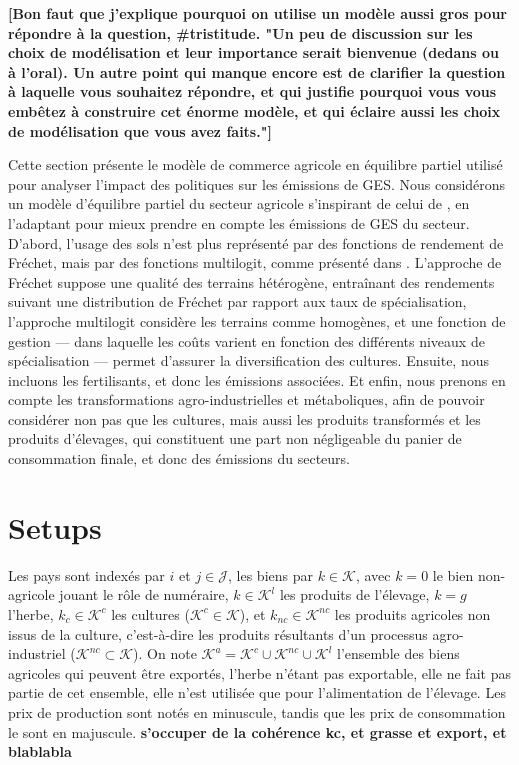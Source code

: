 \textbf{[Bon faut que j'explique pourquoi on utilise un modèle aussi gros pour répondre à la question, \#tristitude. "Un peu de discussion sur les choix de modélisation et leur importance serait bienvenue (dedans ou à l'oral). Un autre point qui manque encore est de clarifier la question à laquelle vous souhaitez répondre, et qui justifie pourquoi vous vous embêtez à construire cet énorme modèle, et qui éclaire aussi les choix de modélisation que vous avez faits."]}

Cette section présente le modèle de commerce agricole en équilibre partiel utilisé pour analyser l’impact des politiques sur les émissions de GES. Nous considérons un modèle d'équilibre partiel du secteur agricole s'inspirant de celui de \cite{Gouel2021}, en l'adaptant pour mieux prendre en compte les émissions de GES du secteur. D'abord, l'usage des sols n'est plus représenté par des fonctions de rendement de Fréchet, mais par des fonctions multilogit, comme présenté dans \cite{Gouel202x}. L’approche de Fréchet suppose une qualité des terrains hétérogène, entraînant des rendements suivant une distribution de Fréchet par rapport aux taux de spécialisation, l’approche multilogit considère les terrains comme homogènes, et une fonction de gestion — dans laquelle les coûts varient en fonction des différents niveaux de spécialisation — permet d'assurer la diversification des cultures. Ensuite, nous incluons les fertilisants, et donc les émissions associées. Et enfin, nous prenons en compte les transformations agro-industrielles et métaboliques, afin de pouvoir considérer non pas que les cultures, mais aussi les produits transformés et les produits d'élevages, qui constituent une part non négligeable du panier de consommation finale, et donc des émissions du secteurs.


\section{Setups}

Les pays sont indexés par $i$ et $j \in \mathcal{J}$, les biens par $k \in \mathcal{K}$, avec $k=0$ le bien non-agricole jouant le rôle de numéraire, $k \in \mathcal{K}^l$ les produits de l’élevage, $k = g$ l’herbe, $k_c \in \mathcal{K}^c$ les cultures ($\mathcal{K}^c \in \mathcal{K}$), et $k_{nc} \in \mathcal{K}^{nc}$ les produits agricoles non issus de la culture, c’est-à-dire les produits résultants d’un processus agro-industriel ($\mathcal{K}^{nc} \subset \mathcal{K}$). On note $\mathcal{K}^a = \mathcal{K}^c \cup \mathcal{K}^{nc} \cup \mathcal{K}^l$ l’ensemble des biens agricoles qui peuvent être exportés, l’herbe n’étant pas exportable, elle ne fait pas partie de cet ensemble, elle n’est utilisée que pour l’alimentation de l’élevage. Les prix de production sont notés en minuscule, tandis que les prix de consommation le sont en majuscule. \textbf{s'occuper de la cohérence kc, et grasse et export, et blablabla}


